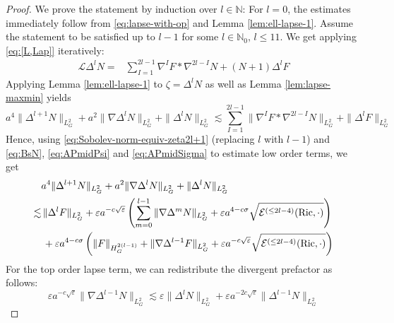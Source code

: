 \documentclass[11pt,leqno,textwidth=10cm]{amsart}
\numberwithin{equation}{section}
\theoremstyle{definition}
\theoremstyle{plain}
\newcommand{\1}{\mathbbm{1}}
\newcommand{\E}{\mathcal{E}}
\renewcommand{\L}{\mathcal{L}}
\newcommand{\N}{\mathbb{N}}
\newcommand{\Ric}{\text{\normalfont{Ric}}}
\renewcommand{\epsilon}{\varepsilon}
\newcommand{\Lap}{\Delta}
\begin{document}
\begin{proof}
We prove the statement by induction over $l\in\N$: For $l=0$, the estimates immediately follow from \eqref{eq:lapse-with-op} and Lemma \ref{lem:ell-lapse-1}. %
Assume the statement to be satisfied up to $l-1$ for some $l\in\N_0,\,l\leq 11$. We get applying \eqref{eq:[L,Lap]} iteratively:
\begin{align*}
\L\Lap^lN%
=&%
\sum_{I=1}^{2l-1}\nabla^IF\ast\nabla^{2l-I}N+(N+1)\Lap^lF
\end{align*}
Applying Lemma \ref{lem:ell-lapse-1} to $\zeta=\Lap^l N$ as well as Lemma \ref{lem:lapse-maxmin} yields
\[a^4\|\Lap^{l+1}N\|_{L^2_G}+a^2\|\nabla\Lap^{l}N\|_{L^2_G}+\|\Lap^l N\|_{L^2_G}\lesssim \sum_{I=1}^{2l-1}\|\nabla^IF\ast\nabla^{2l-I}N\|_{L^2_G}+\|\Lap^lF\|_{L^2_G}\]
Hence, using \eqref{eq:Sobolev-norm-equiv-zeta2l+1} (replacing $l$ with $l-1$) and  \eqref{eq:BsN}, \eqref{eq:APmidPsi} and \eqref{eq:APmidSigma} to estimate low order terms, we get
\begin{align*}
&a^4\|\Lap^{l+1}N\|_{L^2_G}+a^2\|\nabla\Lap^{l}N\|_{L^2_G}+\|\Lap^l N\|_{L^2_G}\\ 
\lesssim&\,\|\Lap^lF\|_{L^2_G}+\epsilon a^{-c\sqrt{\epsilon}}\left(\sum_{m=0}^{l-1}\|\nabla\Lap^mN\|_{L^2_G}+\epsilon a^{4-c\sigma}\sqrt{\E^{(\leq 2l-4)}(\Ric,\cdot)}\right)\\
&\,+\epsilon a^{4-c\sigma}\left(\|F\|_{H^{2(l-1)}_G}+\|\nabla\Lap^{l-1}F\|_{L^2_G}+\epsilon a^{-c\sqrt{\epsilon}}\sqrt{\E^{(\leq 2l-4)}(\Ric,\cdot)}\right)
\end{align*}
For the top order lapse term, we can redistribute the divergent prefactor as follows:
\begin{equation*}
\epsilon a^{-c\sqrt{\epsilon}}\|\nabla\Lap^{l-1}N\|_{L^2_G}\lesssim \epsilon \|\Lap^lN\|_{L^2_G}+\epsilon a^{-2c\sqrt{\epsilon}}\|\Lap^{l-1}N\|_{L^2_G}

\end{equation*}
\end{proof}
\end{document}
